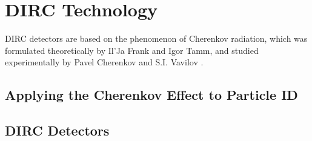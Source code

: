 \chapter{DIRC Technology}
DIRC detectors are based on the phenomenon of Cherenkov radiation, which was formulated theoretically by Il'Ja Frank and Igor Tamm, and studied experimentally by Pavel Cherenkov and S.I. Vavilov \cite{EICWhitePaper}.
\section{Applying the Cherenkov Effect to Particle ID}
\section{DIRC Detectors}